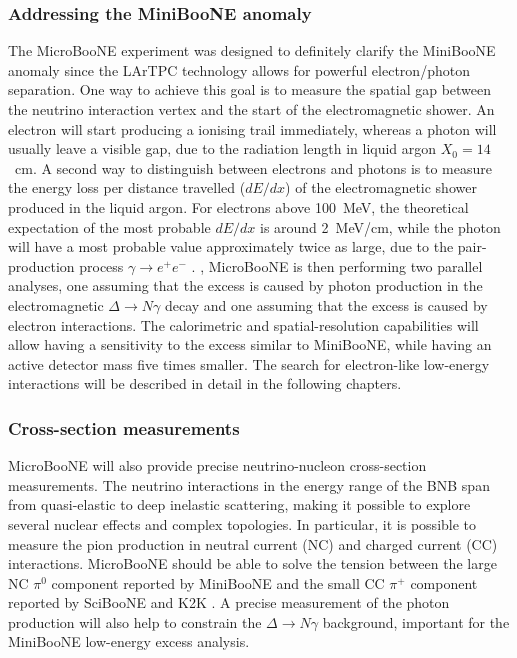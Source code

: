 \subsubsection{Addressing the MiniBooNE anomaly}
The MicroBooNE experiment was designed to definitely clarify the MiniBooNE anomaly since the LArTPC technology allows for powerful electron/photon separation. One way to achieve this goal is to measure the spatial gap between the neutrino interaction vertex and the start of the electromagnetic shower. An electron will start producing a ionising trail immediately, whereas a photon will usually leave a visible gap, due to the radiation length in liquid argon $X_0 = 14$~cm.
A second way to distinguish between electrons and photons is to measure the energy loss per distance travelled ($dE/dx$) of the electromagnetic shower produced in the liquid argon. For electrons above 100~MeV, the theoretical expectation of the most probable $dE/dx$ is around 2~MeV/cm, while the photon will have a most probable value approximately twice as large, due to the pair-production process $\gamma\rightarrow e^+e^-$ \cite{Acciarri:2016sli}. 
, MicroBooNE is then performing two parallel analyses, one assuming that the excess is caused by photon production in the electromagnetic $\Delta\rightarrow N\gamma$ decay and one assuming that the excess is caused by electron interactions.  The calorimetric and spatial-resolution capabilities will allow having a sensitivity to the excess similar to MiniBooNE, while having an active detector mass five times smaller.  The search for electron-like low-energy interactions will be described in detail in the following chapters.

\subsubsection{Cross-section measurements}
MicroBooNE will also provide precise neutrino-nucleon cross-section measurements. The neutrino interactions in the energy range of the BNB span from quasi-elastic to deep inelastic scattering, making it possible to explore several nuclear effects and complex topologies.
In particular, it is possible to measure the pion production in neutral current (NC) and charged current (CC) interactions. MicroBooNE should be able to solve the tension between the large NC $\pi^0$ component reported by MiniBooNE \cite{AguilarArevalo:2008xs} and the small CC $\pi^+$ component reported by SciBooNE \cite{Hiraide:2008eu} and K2K \cite{Tanaka:2006zm}. 
A precise measurement of the photon production will also help to constrain the $\Delta\rightarrow N\gamma$ background, important for the MiniBooNE low-energy excess analysis. 

